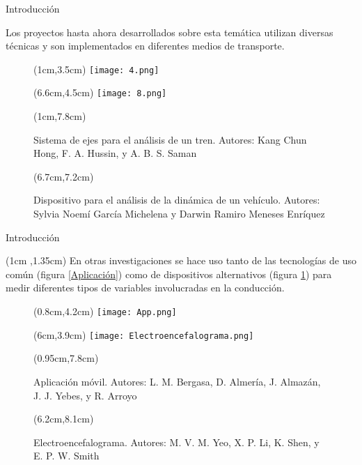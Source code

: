 \documentclass[14pt]{beamer}
\begin{document}
\begin{frame}{Introducción}

Los proyectos hasta ahora desarrollados sobre esta temática utilizan diversas técnicas y son implementados en diferentes medios de transporte.
\vspace{5cm}
\begin{figure}[H]
\begin{textblock*}{5cm}(1cm,3.5cm)
\texttt{[image: 4.png]}
\end{textblock*}
\begin{textblock*}{5cm}(6.6cm,4.5cm)
\texttt{[image: 8.png]}
\end{textblock*}
\begin{textblock*}{5cm}(1cm,7.8cm)
\caption{\justifying Sistema de ejes para el análisis de un tren. Autores: Kang Chun Hong, F. A. Hussin, y A. B. S. Saman} 
\end{textblock*}
\begin{textblock*}{5cm}(6.7cm,7.2cm)
\caption{\justifying Dispositivo para el análisis de la dinámica de un vehículo. Autores: Sylvia Noemí García Michelena y Darwin Ramiro Meneses Enríquez} 
\end{textblock*}
\end{figure}

\end{frame}



\begin{frame}{Introducción}
\begin{textblock*}{\textwidth}(1cm ,1.35cm)
En otras investigaciones se hace uso tanto de las tecnologías de uso común (figura \ref{Aplicación}) como de dispositivos alternativos (figura \ref{Electroencefalograma}) para medir diferentes tipos de variables involucradas en la conducción.
\end{textblock*}
\begin{figure}[H]
\begin{textblock*}{5cm}(0.8cm,4.2cm)
\texttt{[image: App.png]}
\end{textblock*}
\begin{textblock*}{5cm}(6cm,3.9cm)
\texttt{[image: Electroencefalograma.png]}
\end{textblock*}
\begin{textblock*}{4.7cm}(0.95cm,7.8cm)
\caption{\justifying Aplicación móvil. Autores: L. M. Bergasa, D. Almería, J. Almazán, J. J. Yebes, y R. Arroyo} 
\label{Aplicación}
\end{textblock*}
\begin{textblock*}{6cm}(6.2cm,8.1cm)
\caption{\justifying Electroencefalograma. Autores: M. V. M. Yeo, X. P. Li, K. Shen, y E. P. W. Smith} 
\label{Electroencefalograma}
\end{textblock*}
\end{figure}

\end{frame}
\end{document}

